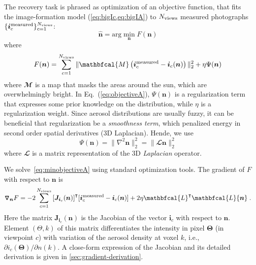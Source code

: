 \documentclass[10pt,letterpaper]{article}
\newcommand{\Mask}{\mathbfcal{M}}
\newcommand{\Laplacian}{\mathbfcal{L}}
\newcommand{\Grad}[1]{\bm{\triangledown_{#1}}}
\newcommand{\argmin}{\mathrm{arg}\min}
\newcommand{\roundy}[1]{\left(#1\right)}
\newcommand{\transpose}[1]{{#1}^\intercal}
\begin{document}
The recovery task is phrased as optimization of an objective function,
that fits the image-formation model (\cref{eq:bigIc,eq:bigIA}) to
$N_{\rm views}$ measured photographs $\{ {\bm i}^{\rm
  measured}_c\}_{c=1}^{N_{\rm views}}$:
\begin{equation}
  \label{eq:minobjectiveA}
  \hat{\bm n} =
  \argmin_{{\bm n}} F({\bm n})
\end{equation}
where
\begin{equation}
  \label{eq:objectiveA}
  F({\bm n})
  = \sum_{c=1}^{N_{\rm views}}
  \| \Mask \roundy{{\bm i}^{\rm measured}_c - {\bm i}_c({\bm n})}\|^2_2
  + \eta \Psi({\bm n})
\end{equation}
where $\Mask$ is a map that masks the areas around
the sun, which are overwhelmingly bright. %
In Eq.~(\ref{eq:objectiveA}), $\Psi({\bm n})$ is a regularization term that expresses some prior knowledge on the distribution, while $\eta$ is a regularization weight.  Since aerosol distributions are usually fuzzy,
it can be beneficial that regularization be a {\em smoothness term}, which penalized energy in second order spatial derivatives (3D Laplacian). Hende, we use
\begin{equation}
  \label{eq:regularizer}
  \Psi({\bm n}) = \| \nabla^2{\bm n}\|^2_2 = \| \Laplacian{\bm n}\|^2_2
\end{equation}
where $\Laplacian$ is a matrix representation of the 3D \emph{Laplacian}
operator.

We solve~\cref{eq:minobjectiveA} using standard optimization tools.
The gradient of $F$ with respect to ${\bm n}$ is
\begin{align}
  \Grad{{\bm n}} F = -2\sum_{c=1}^{N_{\rm views}}
  \transpose{\left[{\bm J}_{{\bm i}_c}({\bm n})\right]} [{\bm i}^{\rm
    measured}_c - {\bm i}_c({\bm n})] + 2 \eta \transpose{\Laplacian}\Laplacian{\bm n} \;.
  \label{eq:gradient1}
\end{align}
Here the matrix ${\bm J}_{{\bm i}_c}({\bm n})$ is the Jacobian of the
vector ${\bm i}_c$ with respect to ${\bm n}$.  Element $(\Theta,k)$ of
this matrix differentiates the intensity in pixel ${\bm \Theta}$ (in
viewpoint $c$) with variation of the aerosol density at voxel $k$, i.e.,
$\partial i_c({\bm \Theta})/\partial{n(k)}$.  A
close-form expression of the Jacobian and its detailed derivation is
given in \cref{sec:gradient-derivation}.

\end{document}
